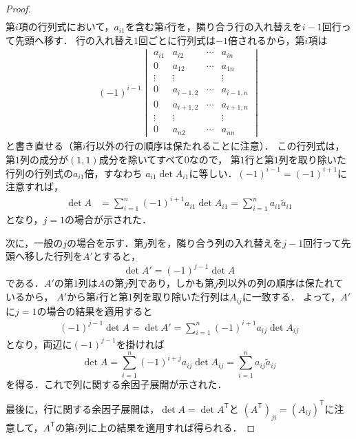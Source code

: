 \begin{leftbar}
\begin{proof}
\begin{align*}
\end{align*}
第$i$項の行列式において，$a_{i1}$を含む第$i$行を，隣り合う行の入れ替えを$i-1$回行って先頭へ移す．
行の入れ替え$1$回ごとに行列式は$-1$倍されるから，第$i$項は
\begin{align*}
  (-1)^{i-1}
  \begin{vmatrix}
    a_{i1} & a_{i2}     & \cdots & a_{in} \\
    0      & a_{12}     & \cdots & a_{1n} \\
    \vdots & \vdots     &        & \vdots \\
    0      & a_{i-1,2}  & \cdots & a_{i-1,n} \\
    0      & a_{i+1,2}  & \cdots & a_{i+1,n} \\
    \vdots & \vdots     &        & \vdots \\
    0      & a_{n2}     & \cdots & a_{nn}
  \end{vmatrix}
\end{align*}
と書き直せる（第$i$行以外の行の順序は保たれることに注意）．
この行列式は，第$1$列の成分が$(1,1)$成分を除いてすべて$0$なので，
第$1$行と第$1$列を取り除いた行列の行列式の$a_{i1}$倍，すなわち
$a_{i1}\det A_{i1}$に等しい．$(-1)^{i-1} = (-1)^{i+1}$に注意すれば，
\begin{align*}
  \det A
  &= \sum_{i=1}^{n} (-1)^{i+1} a_{i1} \det A_{i1}
   = \sum_{i=1}^{n} a_{i1} \tilde{a}_{i1}
\end{align*}
となり，$j=1$の場合が示された．

次に，一般の$j$の場合を示す．第$j$列を，隣り合う列の入れ替えを$j-1$回行って先頭へ移した行列を$A'$とすると，
\[
  \det A' = (-1)^{j-1} \det A
\]
である．$A'$の第$1$列は$A$の第$j$列であり，しかも第$j$列以外の列の順序は保たれているから，
$A'$から第$i$行と第$1$列を取り除いた行列は$A_{ij}$に一致する．
よって，$A'$に$j=1$の場合の結果を適用すると
\begin{align*}
  (-1)^{j-1} \det A = \det A'
  = \sum_{i=1}^{n} (-1)^{i+1} a_{ij} \det A_{ij}
\end{align*}
となり，両辺に$(-1)^{j-1}$を掛ければ
\[
  \det A = \sum_{i=1}^{n} (-1)^{i+j} a_{ij} \det A_{ij}
         = \sum_{i=1}^{n} a_{ij} \tilde{a}_{ij}
\]
を得る．これで列に関する余因子展開が示された．

最後に，行に関する余因子展開は，$\det A = \det A^\mathsf{T}$と
$(A^\mathsf{T})_{ji} = (A_{ij})^\mathsf{T}$に注意して，$A^\mathsf{T}$の第$i$列に上の結果を適用すれば得られる．
\end{proof}
\end{leftbar}

